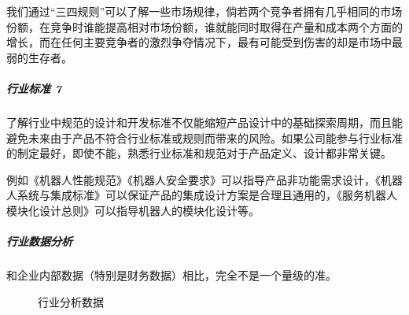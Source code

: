 \documentclass[letterpaper,11pt,english]{sphinxmanual}
\begin{document}
我们通过“三四规则”可以了解一些市场规律，倘若两个竞争者拥有几乎相同的市场份额，在竞争时谁能提高相对市场份额，谁就能同时取得在产量和成本两个方面的增长，而在任何主要竞争者的激烈争夺情况下，最有可能受到伤害的却是市场中最弱的生存者。


\subparagraph{行业标准 7\sphinxfootnotemark[436]}
\label{\detokenize{chapter_knowledge/industry_analysis:id17}}%
\begin{footnotetext}[436]\sphinxAtStartFootnote
{}
%
\end{footnotetext}\ignorespaces 
了解行业中规范的设计和开发标准不仅能缩短产品设计中的基础探索周期，而且能避免未来由于产品不符合行业标准或规则而带来的风险。如果公司能参与行业标准的制定最好，即使不能，熟悉行业标准和规范对于产品定义、设计都非常关键。

例如《机器人性能规范》《机器人安全要求》可以指导产品非功能需求设计，《机器人系统与集成标准》可以保证产品的集成设计方案是合理且通用的，《服务机器人模块化设计总则》可以指导机器人的模块化设计等。


\subparagraph{行业数据分析}
\label{\detokenize{chapter_knowledge/industry_analysis:id18}}
和企业内部数据（特别是财务数据）相比，完全不是一个量级的准。

\begin{figure}[H]
\centering
\capstart

\noindent{}
\caption{行业分析数据}\label{\detokenize{chapter_knowledge/industry_analysis:id29}}\end{figure}
\end{document}

